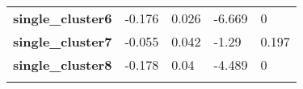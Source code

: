\documentclass[]{article}
\begin{document}
\begin{longtable}[c]{@{}lllll@{}}
\begin{minipage}[t]{0.31\columnwidth}\raggedright\strut
\textbf{single\_cluster6}
\strut\end{minipage} &
\begin{minipage}[t]{0.13\columnwidth}\raggedright\strut
-0.176
\strut\end{minipage} &
\begin{minipage}[t]{0.16\columnwidth}\raggedright\strut
0.026
\strut\end{minipage} &
\begin{minipage}[t]{0.12\columnwidth}\raggedright\strut
-6.669
\strut\end{minipage} &
\begin{minipage}[t]{0.12\columnwidth}\raggedright\strut
0
\strut\end{minipage}\tabularnewline
\begin{minipage}[t]{0.31\columnwidth}\raggedright\strut
\textbf{single\_cluster7}
\strut\end{minipage} &
\begin{minipage}[t]{0.13\columnwidth}\raggedright\strut
-0.055
\strut\end{minipage} &
\begin{minipage}[t]{0.16\columnwidth}\raggedright\strut
0.042
\strut\end{minipage} &
\begin{minipage}[t]{0.12\columnwidth}\raggedright\strut
-1.29
\strut\end{minipage} &
\begin{minipage}[t]{0.12\columnwidth}\raggedright\strut
0.197
\strut\end{minipage}\tabularnewline
\begin{minipage}[t]{0.31\columnwidth}\raggedright\strut
\textbf{single\_cluster8}
\strut\end{minipage} &
\begin{minipage}[t]{0.13\columnwidth}\raggedright\strut
-0.178
\strut\end{minipage} &
\begin{minipage}[t]{0.16\columnwidth}\raggedright\strut
0.04
\strut\end{minipage} &
\begin{minipage}[t]{0.12\columnwidth}\raggedright\strut
-4.489
\strut\end{minipage} &
\begin{minipage}[t]{0.12\columnwidth}\raggedright\strut
0
\strut\end{minipage}\tabularnewline
\begin{minipage}[t]{0.31\columnwidth}\raggedright\strut

\end{minipage}
\end{longtable}
\end{document}
